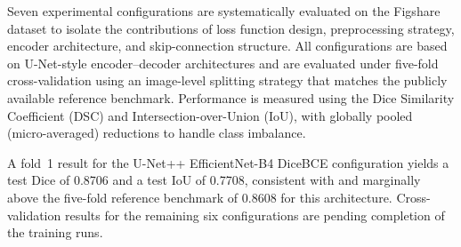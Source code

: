 \documentclass[a4paper,12pt]{article}
\begin{document}
Seven experimental configurations are systematically evaluated on the Figshare dataset to isolate
the contributions of loss function design, preprocessing strategy, encoder architecture, and
skip-connection structure. All configurations are based on U-Net-style encoder--decoder
architectures and are evaluated under five-fold cross-validation using an image-level splitting
strategy that matches the publicly available reference benchmark. Performance is measured using
the Dice Similarity Coefficient (DSC) and Intersection-over-Union (IoU), with globally pooled
(micro-averaged) reductions to handle class imbalance.

A fold~1 result for the U-Net++ EfficientNet-B4 DiceBCE configuration yields a test Dice of
0.8706 and a test IoU of 0.7708, consistent with and marginally above the five-fold reference
benchmark of 0.8608 for this architecture. Cross-validation results for the remaining six
configurations are pending completion of the training runs.

\newpage
{}
\tableofcontents

\newpage
{}
\listoffigures

\newpage
{}
\listoftables

\newpage
{}
\end{document}
